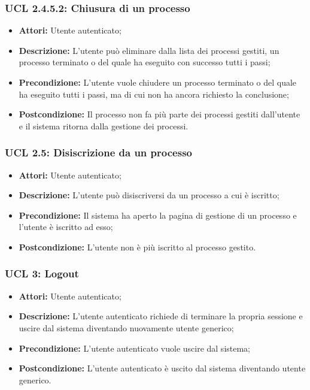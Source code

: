 \subsubsection{UCL 2.4.5.2: Chiusura di un processo}
\begin{itemize}
\item \textbf{Attori:} Utente autenticato;
\item \textbf{Descrizione:} L'utente può eliminare dalla lista dei processi gestiti, un processo terminato o del quale ha eseguito con successo tutti i passi;
\item \textbf{Precondizione:} L'utente vuole chiudere un processo terminato o del quale ha eseguito tutti i passi, ma di cui non ha ancora richiesto la conclusione;
\item \textbf{Postcondizione:} Il processo non fa più parte dei processi gestiti dall'utente e il sistema ritorna dalla gestione dei processi.
\end{itemize}

\hypertarget{L2.5}{}
\subsubsection{UCL 2.5: Disiscrizione da un processo}
\begin{itemize}
\item \textbf{Attori:} Utente autenticato;
\item \textbf{Descrizione:} L'utente può disiscriversi da un processo a cui è iscritto;
\item \textbf{Precondizione:} Il sistema ha aperto la pagina di gestione di un processo e l'utente è iscritto ad esso;
\item \textbf{Postcondizione:} L'utente non è più iscritto al processo gestito.
\end{itemize}

\hypertarget{L3}{}
\subsubsection{UCL 3: Logout}
\begin{itemize}
	\item \textbf{Attori:} Utente autenticato;
	\item \textbf{Descrizione:} L'utente autenticato richiede di terminare la propria sessione e uscire dal sistema diventando nuovamente utente generico;
	\item \textbf{Precondizione:} L'utente autenticato vuole uscire dal sistema;
	\item \textbf{Postcondizione:} L'utente autenticato è uscito dal sistema diventando utente generico.
\end{itemize}